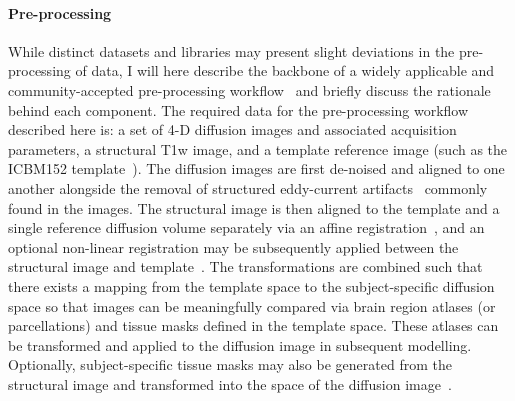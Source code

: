 \paragraph*{Pre-processing}
While distinct datasets and libraries may present slight deviations in the pre-processing of data, I will here describe
the backbone of a widely applicable and community-accepted pre-processing
workflow~\cite{WOOLRICH2009S173,jenkinson2012fsl,Glasser2013-vf} and briefly discuss the rationale behind each component.
The required data for the pre-processing workflow described here is: a set of 4-D diffusion images and associated
acquisition parameters, a structural T1w image, and a template reference image (such as the ICBM152
template~\cite{lancaster2007bias}). The diffusion images are first de-noised and aligned to one another alongside the
removal of structured eddy-current artifacts~\cite{andersson2016integrated} commonly found in the images. The structural
image is then aligned to the template and a single reference diffusion volume separately via an affine
registration~\cite{jenkinson2001global}, and an optional non-linear registration may be subsequently applied between
the structural image and template~\cite{jenkinson2012fsl}. The transformations are combined such that there exists a
mapping from the template space to the subject-specific diffusion space so that images can be meaningfully compared via
brain region atlases (or parcellations) and tissue masks defined in the template space. These atlases can be transformed
and applied to the diffusion image in subsequent modelling. Optionally, subject-specific tissue masks may also be
generated from the structural image and transformed into the space of the diffusion image~\cite{zhang2001segmentation}.

